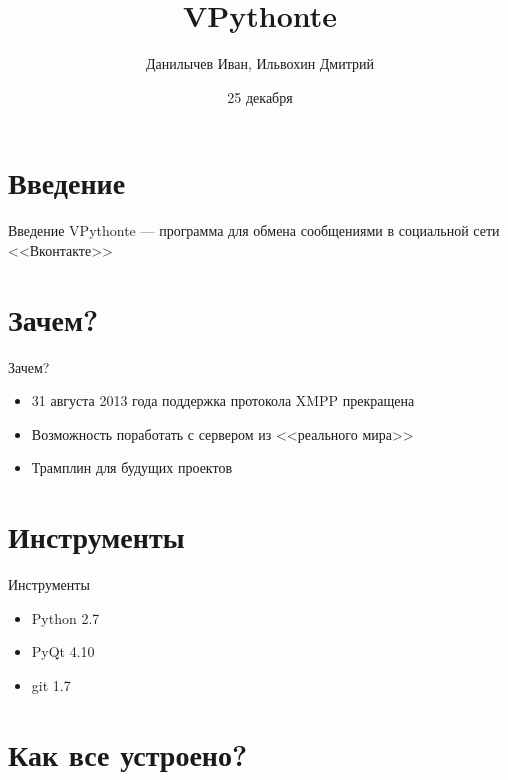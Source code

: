 \documentclass{beamer}
\title[Проект по ООП]{VPythonte}
\author{Данилычев Иван, Ильвохин Дмитрий}
\institute{Московский Авиационый Институт}
\date{25 декабря}
\begin{document}
\begin{frame}
  \titlepage
\end{frame}


%

\section{Введение}
\begin{frame}{Введение}
VPythonte --- программа для обмена сообщениями в социальной сети <<Вконтакте>>
\end{frame}

\section{Зачем?}
\begin{frame}{Зачем?}
\begin{itemize}
\item<1-> 31 августа 2013 года поддержка протокола XMPP прекращена
\item<2-> Возможность поработать с сервером из <<реального мира>>
\item<3-> Трамплин для будущих проектов
\end{itemize}
\end{frame}

\section{Инструменты}
\begin{frame}{Инструменты}
\begin{itemize}
\item<1-> Python 2.7
\item<2-> PyQt 4.10
\item<3-> git 1.7
\end{itemize}
\end{frame}

\section{Как все устроено?}
\end{document}
